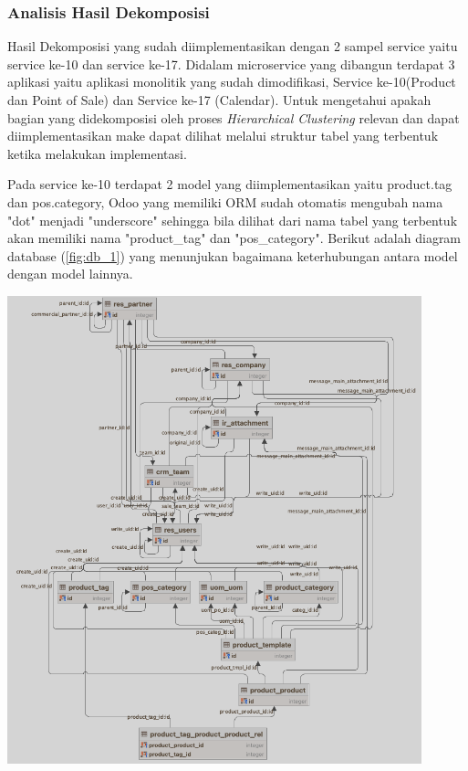 
\subsubsection{Analisis Hasil Dekomposisi}
Hasil Dekomposisi yang sudah diimplementasikan dengan 2 sampel service yaitu service ke-10 dan service ke-17. Didalam microservice yang dibangun terdapat 3 aplikasi yaitu aplikasi monolitik yang sudah dimodifikasi, Service ke-10(Product dan Point of Sale) dan Service ke-17 (Calendar). Untuk mengetahui apakah bagian yang didekomposisi oleh proses \textit{Hierarchical Clustering} relevan dan dapat diimplementasikan make dapat dilihat melalui struktur tabel yang terbentuk ketika melakukan implementasi.

Pada service ke-10 terdapat 2 model yang diimplementasikan yaitu product.tag dan pos.category, Odoo yang memiliki ORM sudah otomatis mengubah nama "dot" menjadi "underscore" sehingga bila dilihat dari nama tabel yang terbentuk akan memiliki nama "product\_tag" dan "pos\_category". Berikut adalah diagram database (\ref{fig:db_1})  yang menunjukan bagaimana keterhubungan antara model dengan model lainnya. 

\begin{center}
	\includegraphics[width=12cm]{img/bab_4/db_1.png}
	\label{fig:db_1}
\end{center}

